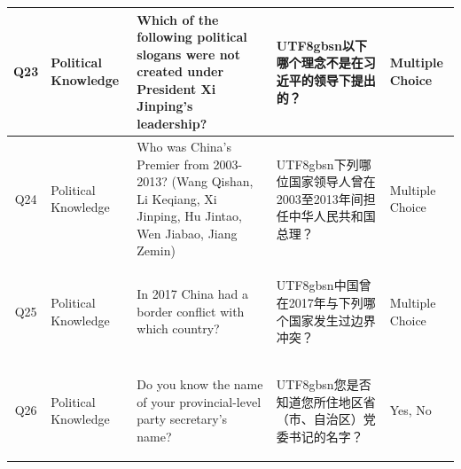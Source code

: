 \documentclass[11pt]{article}
\newcommand{\zh}[1]{\begin{CJK*}{UTF8}{gbsn}#1\end{CJK*}}
\begin{document}
\begin{table}[H]
{\begin{tabular}{|c|p{}|p{}|p{}|p{}|}
        Q23 & Political Knowledge & Which of the following political slogans were not created under President Xi Jinping's leadership? & \zh{以下哪个理念不是在习近平的领导下提出的？} & Multiple Choice \\\hline
        Q24 & Political Knowledge & Who was China's Premier from 2003-2013? (Wang Qishan, Li Keqiang, Xi Jinping, Hu Jintao, Wen Jiabao, Jiang Zemin) & \zh{下列哪位国家领导人曾在2003至2013年间担任中华人民共和国总理？} & Multiple Choice \\\hline
        Q25 & Political Knowledge & In 2017 China had a border conflict with which country? & \zh{中国曾在2017年与下列哪个国家发生过边界冲突？} & Multiple Choice \\\hline
        Q26 & Political Knowledge & Do you know the name of your provincial-level party secretary's name? & \zh{您是否知道您所住地区省（市、自治区）党委书记的名字？} & Yes, No \\\hline
        \end{tabular}
    }
\end{table}
\end{document}
